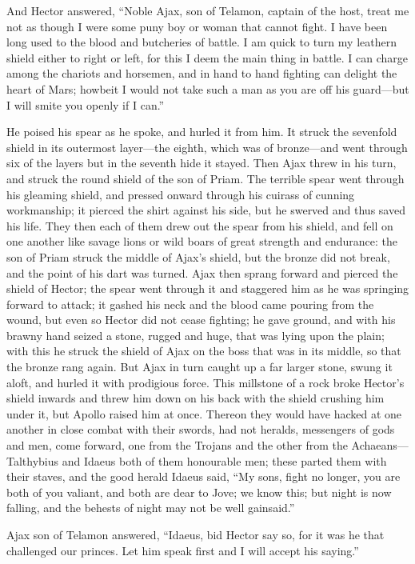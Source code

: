 And Hector answered, “Noble Ajax, son of Telamon, captain of the host,
treat me not as though I were some puny boy or woman that cannot fight. I
have been long used to the blood and butcheries of battle. I am quick to
turn my leathern shield either to right or left, for this I deem the main
thing in battle. I can charge among the chariots and horsemen, and in hand
to hand fighting can delight the heart of Mars; howbeit I would not take
such a man as you are off his guard—but I will smite you openly if I
can.”

He poised his spear as he spoke, and hurled it from him. It struck the
sevenfold shield in its outermost layer—the eighth, which was of
bronze—and went through six of the layers but in the seventh hide it
stayed. Then Ajax threw in his turn, and struck the round shield of the
son of Priam. The terrible spear went through his gleaming shield, and
pressed onward through his cuirass of cunning workmanship; it pierced the
shirt against his side, but he swerved and thus saved his life. They then
each of them drew out the spear from his shield, and fell on one another
like savage lions or wild boars of great strength and endurance: the son
of Priam struck the middle of Ajax’s shield, but the bronze did not break,
and the point of his dart was turned. Ajax then sprang forward and pierced
the shield of Hector; the spear went through it and staggered him as he
was springing forward to attack; it gashed his neck and the blood came
pouring from the wound, but even so Hector did not cease fighting; he gave
ground, and with his brawny hand seized a stone, rugged and huge, that was
lying upon the plain; with this he struck the shield of Ajax on the boss
that was in its middle, so that the bronze rang again. But Ajax in turn
caught up a far larger stone, swung it aloft, and hurled it with
prodigious force. This millstone of a rock broke Hector’s shield inwards
and threw him down on his back with the shield crushing him under it, but
Apollo raised him at once. Thereon they would have hacked at one another
in close combat with their swords, had not heralds, messengers of gods and
men, come forward, one from the Trojans and the other from the Achaeans—Talthybius
and Idaeus both of them honourable men; these parted them with their
staves, and the good herald Idaeus said, “My sons, fight no longer, you
are both of you valiant, and both are dear to Jove; we know this; but
night is now falling, and the behests of night may not be well gainsaid.”

Ajax son of Telamon answered, “Idaeus, bid Hector say so, for it was he
that challenged our princes. Let him speak first and I will accept his
saying.”

